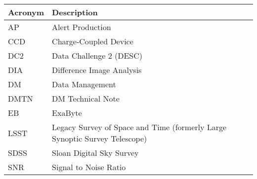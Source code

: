 \addtocounter{table}{-1}
\begin{longtable}{p{}p{}}\hline
\textbf{Acronym} & \textbf{Description}  \\\hline

AP & Alert Production \\\hline
CCD & Charge-Coupled Device \\\hline
DC2 & Data Challenge 2 (DESC) \\\hline
DIA & Difference Image Analysis \\\hline
DM & Data Management \\\hline
DMTN & DM Technical Note \\\hline
EB & ExaByte \\\hline
LSST & Legacy Survey of Space and Time (formerly Large Synoptic Survey Telescope) \\\hline
SDSS & Sloan Digital Sky Survey \\\hline
SNR & Signal to Noise Ratio \\\hline
\end{longtable}
